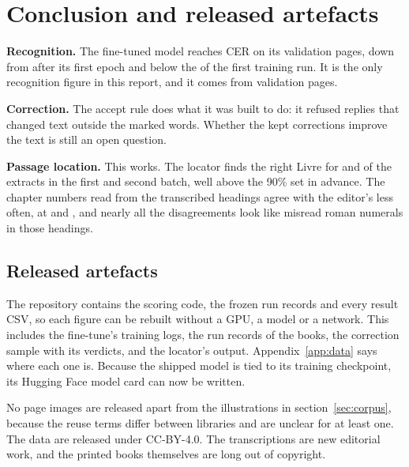 \section{Conclusion and released artefacts}
\label{sec:conclusion}

\textbf{Recognition.} The fine-tuned model reaches \trainCer{} CER on its
validation pages, down from \trainCerFirstEpoch{} after its first epoch and
below the \trainCerConstant{} of the first training run. It is the only
recognition figure in this report, and it comes from validation pages.

\textbf{Correction.} The accept rule does what it was built to do: it refused
\corrRewritesCaught{} replies that changed text outside the marked words. Whether the kept corrections improve the text is
still an open question.

\textbf{Passage location.} This works. The locator finds the right Livre for
\locLivreAccuracyWorkbook{} and \locLivreAccuracyCatalogue{} of the extracts in
the first and second batch, well above the 90\% set in advance. The chapter
numbers read from the transcribed headings agree with the editor's less often,
at \locChapterAccuracyWorkbook{} and \locChapterAccuracyCatalogue{}, and nearly
all the disagreements look like misread roman numerals in those headings.

\subsection{Released artefacts}
\label{sec:artefacts}

The repository contains the scoring code, the frozen run records and every
result CSV, so each figure can be rebuilt without a GPU, a model or a network.
This includes the fine-tune's training logs, the run records of the
\ocrBooks{} books, the correction sample with its verdicts, and the locator's
output. Appendix~\ref{app:data} says where each one is. Because the shipped
model is tied to its training checkpoint, its Hugging Face model card can now
be written.

No page images are released apart from the illustrations in
section~\ref{sec:corpus}, because the reuse terms differ between libraries and
are unclear for at least one. The data are released under CC-BY-4.0. The
transcriptions are new editorial work, and the printed books themselves are
long out of copyright.

